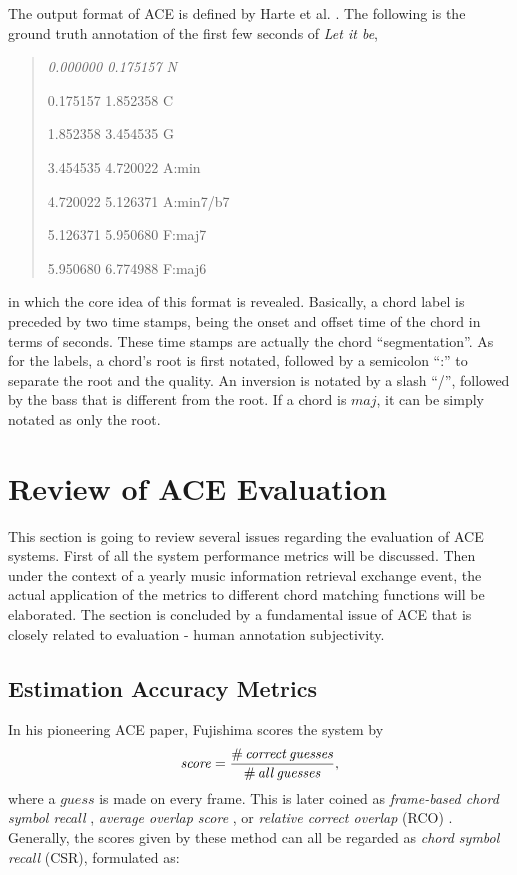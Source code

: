 The output format of ACE is defined by Harte et al. \cite{harte2005symbolic}. The following is the ground truth annotation of the first few seconds of {\it Let it be},
\begin{quote}\footnotesize \it
0.000000 0.175157 N

0.175157 1.852358 C

1.852358 3.454535 G

3.454535 4.720022 A:min

4.720022 5.126371 A:min7/b7

5.126371 5.950680 F:maj7

5.950680 6.774988 F:maj6
\end{quote}
in which the core idea of this format is revealed. Basically, a chord label is preceded by two time stamps, being the onset and offset time of the chord in terms of seconds. These time stamps are actually the chord ``segmentation''. As for the labels, a chord's root is first notated, followed by a semicolon ``:'' to separate the root and the quality. An inversion is notated by a slash ``/'', followed by the bass that is different from the root. If a chord is $maj$, it can be simply notated as only the root.

\newpage
\section{Review of ACE Evaluation} \label{sec:2-eval}
This section is going to review several issues regarding the evaluation of ACE systems. First of all the system performance metrics will be discussed. Then under the context of a yearly music information retrieval exchange event, the actual application of the metrics to different chord matching functions will be elaborated. The section is concluded by a fundamental issue of ACE that is closely related to evaluation - human annotation subjectivity.

\subsection{Estimation Accuracy Metrics}
In his pioneering ACE paper, Fujishima \cite{fujishima1999realtime} scores the system by
\begin{equation}
\mathit{score = {\#\,correct\,guesses\over\#\,all\,guesses},}
\end{equation}
where a $guess$ is made on every frame. This is later coined as {\it frame-based chord symbol recall} \cite{harte2010towards}, {\it average overlap score} \cite{oudre2010template}, or {\it relative correct overlap} (RCO) \cite{mauch2010automatic}. Generally, the scores given by these method can all be regarded as {\it chord symbol recall} (CSR), formulated as:

